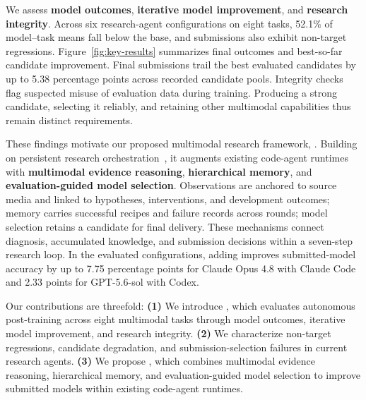 %
We assess \textbf{model outcomes}, \textbf{iterative model improvement}, and \textbf{research integrity}. Across six research-agent configurations on eight tasks, 52.1\% of model--task means fall below the base, and submissions also exhibit non-target regressions. Figure~\ref{fig:key-results} summarizes final outcomes and best-so-far candidate improvement. Final submissions trail the best evaluated candidates by up to 5.38 percentage points across recorded candidate pools. Integrity checks flag suspected misuse of evaluation data during training. Producing a strong candidate, selecting it reliably, and retaining other multimodal capabilities thus remain distinct requirements.

%
These findings motivate our proposed multimodal research framework, \harness{}. Building on persistent research orchestration~\citep{arbor}, it augments existing code-agent runtimes with \textbf{multimodal evidence reasoning}, \textbf{hierarchical memory}, and \textbf{evaluation-guided model selection}. Observations are anchored to source media and linked to hypotheses, interventions, and development outcomes; memory carries successful recipes and failure records across rounds; model selection retains a candidate for final delivery. These mechanisms connect diagnosis, accumulated knowledge, and submission decisions within a seven-step research loop. In the evaluated configurations, adding \harness{} improves submitted-model accuracy by up to 7.75 percentage points for Claude Opus 4.8 with Claude Code and 2.33 points for GPT-5.6-sol with Codex.

Our contributions are threefold: \textbf{(1)} We introduce \benchmark{}, which evaluates autonomous post-training across eight multimodal tasks through model outcomes, iterative model improvement, and research integrity. \textbf{(2)} We characterize non-target regressions, candidate degradation, and submission-selection failures in current research agents. \textbf{(3)} We propose \harness{}, which combines multimodal evidence reasoning, hierarchical memory, and evaluation-guided model selection to improve submitted models within existing code-agent runtimes.

%
%
%
%
%
%
%
%
%
%
%
%
%
%
%
